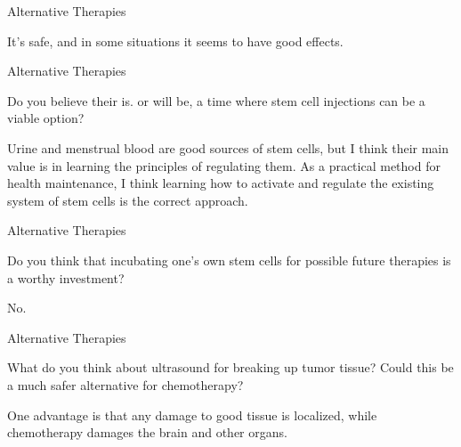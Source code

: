 \documentclass[11pt,oneside,openany,extrafontsizes]{memoir}
\begin{document}
\begin{standalonequote}{Alternative Therapies}

    \begin{answer}
       It's safe, and in some situations it seems to have good effects. 
    \end{answer}
\end{standalonequote}

\begin{qaexchange}{Alternative Therapies}

    \begin{question}
         Do you believe their is. or will be, a time where stem cell injections can be a viable option? 
    \end{question}

    \begin{answer}
      Urine and menstrual blood are good sources of stem cells, but I think their main value is in learning the principles of regulating them. As a practical method for health maintenance, I think learning how to activate and regulate the existing system of stem cells is the correct approach.
    \end{answer}
\end{qaexchange}

\begin{qaexchange}{Alternative Therapies}

    \begin{question}
        Do you think that incubating one's own stem cells for possible future therapies is a worthy investment?
    \end{question}

    \begin{answer}
      No.
    \end{answer}
\end{qaexchange}

\begin{qaexchange}{Alternative Therapies}

    \begin{question}
        What do you think about ultrasound for breaking up tumor tissue? Could this be a much safer alternative for chemotherapy?
    \end{question}

    \begin{answer}
      One advantage is that any damage to good tissue is localized, while chemotherapy damages the brain and other organs.
    \end{answer}
\end{qaexchange}
\end{document}

